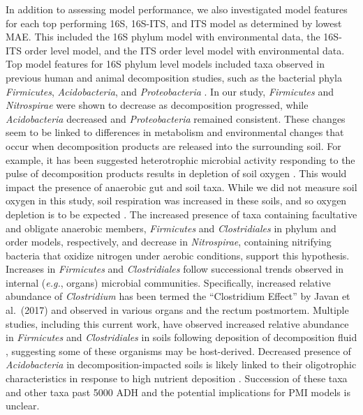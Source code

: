 \documentclass[
  10pt,
  letterpaper,
]{article}
\begin{document}
In addition to assessing model performance, we also investigated model
features for each top performing 16S, 16S-ITS, and ITS model as
determined by lowest MAE. This included the 16S phylum model with
environmental data, the 16S-ITS order level model, and the ITS order
level model with environmental data. Top model features for 16S phylum
level models included taxa observed in previous human and animal
decomposition studies, such as the bacterial phyla \emph{Firmicutes},
\emph{Acidobacteria}, and \emph{Proteobacteria}
\citep{cobaugh_functional_2015, metcalf_microbial_2016}. In our study,
\emph{Firmicutes} and \emph{Nitrospirae} were shown to decrease as
decomposition progressed, while \emph{Acidobacteria} decreased and
\emph{Proteobacteria} remained consistent. These changes seem to be
linked to differences in metabolism and environmental changes that occur
when decomposition products are released into the surrounding soil. For
example, it has been suggested heterotrophic microbial activity
responding to the pulse of decomposition products results in depletion
of soil oxygen \citep{taylor_soil_2024, keenan_mortality_2018}. This
would impact the presence of anaerobic gut and soil taxa. While we did
not measure soil oxygen in this study, soil respiration was increased in
these soils, and so oxygen depletion is to be expected
\citep{mason_body_2022}. The increased presence of taxa containing
facultative and obligate anaerobic members, \emph{Firmicutes} and
\emph{Clostridiales} in phylum and order models, respectively, and
decrease in \emph{Nitrospirae}, containing nitrifying bacteria that
oxidize nitrogen under aerobic conditions, support this hypothesis.
Increases in \emph{Firmicutes} and \emph{Clostridiales} follow
successional trends observed in internal (\emph{e.g.}, organs) microbial
communities. Specifically, increased relative abundance of
\emph{Clostridium} has been termed the ``Clostridium Effect'' by Javan
et al.~(2017) \citep{javan_cadaver_2017} and observed in various organs
\citep{javan_human_2016, javan_cadaver_2017} and the rectum
\citep{debruyn_postmortem_2017} postmortem. Multiple studies, including
this current work, have observed increased relative abundance in
\emph{Firmicutes} and \emph{Clostridiales} in soils following deposition
of decomposition fluid
\citep{cobaugh_functional_2015, mason_microbial_2023, singh_temporal_2018, keenan_microbial_2023},
suggesting some of these organisms may be host-derived. Decreased
presence of \emph{Acidobacteria} in decomposition-impacted soils is
likely linked to their oligotrophic characteristics in response to high
nutrient deposition \citep{cobaugh_functional_2015, fierer_toward_2007}.
Succession of these taxa and other taxa past 5000 ADH and the potential
implications for PMI models is unclear.
\end{document}
